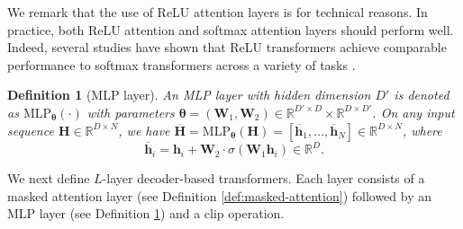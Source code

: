 \documentclass[10pt]{article}
\newtheorem{definition}[theorem]{Definition}
\renewcommand{\bar}{\overline}
\newcommand{\<}{\left\langle}
\renewcommand{\>}{\right\rangle}
\renewcommand{\bQ}{\mathbf{Q}}
\newenvironment{talign*}
 {\let\displaystyle\textstyle\csname align*\endcsname}
 {\endalign}
\newcommand{\Attn}{{\rm Attn}}
\newcommand{\TF}{{\rm TF}}
\newcommand{\barsig}{\sigma}
\newcommand{\clip}{\mathsf{clip}}
\newcommand{\MLP}{\mathrm{MLP}}
\newcommand{\bMAtt}{\btheta_{\tt mattn}}
\newcommand{\bthetamlp}{\btheta_{\tt mlp}}
\newcommand{\paren}[1]{{\left( #1 \right)}}
\newcommand{\set}[1]{{\left\{ #1 \right\}}}
\newcommand{\sets}[1]{{\{ #1 \}}}
\newcommand{\defeq}{\mathrel{\mathop:}=}
\newcommand{\R}{\mathbb{R}}
\newcommand{\proj}{{\rm proj}}
\newcommand{\clipval}{{\mathsf{R}}}
\def\bH{{\mathbf H}}
\def\bK{{\mathbf K}}
\def\bQ{{\mathbf Q}}
\def\bV{{\mathbf V}}
\def\bW{{\mathbf W}}
\def\btheta{{\boldsymbol \theta}}
\def\bh{{\mathbf h}}
\begin{document}
We remark that the use of ReLU attention layers is for technical reasons. In practice, both ReLU attention and softmax attention layers should perform well. Indeed, several studies have shown that ReLU transformers achieve comparable performance to softmax transformers  across a variety of tasks \citep{wortsman2023replacing, shen2023study, bai2023transformers}.

\begin{definition}[MLP layer]
\label{def:mlp}
An MLP layer with hidden dimension $D'$ is denoted as $\MLP_{\btheta}(\cdot)$ with parameters $\btheta=(\bW_1,\bW_2)\in\R^{D'\times D}\times\R^{D\times D'}$. On any input sequence $\bH\in\R^{D\times N}$, we have $\bar{\bH} = \MLP_{\btheta}(\bH) = [\bar{\bh}_1, \ldots, \bar{\bh}_N] \in \R^{D \times N}$, where
\[
\bar{\bh}_i=\bh_i+\bW_2 \cdot \sigma(\bW_1\bh_i) \in \R^D.
\]
\end{definition}
We next define $L$-layer decoder-based transformers. Each layer consists of a masked attention layer (see Definition \ref{def:masked-attention}) followed by an MLP layer (see Definition \ref{def:mlp}) and a clip operation. 


\end{document}
